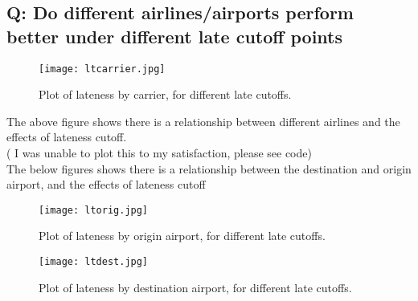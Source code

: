 \documentclass[12pt]{article}
\begin{document}
		\subsection{Q: Do different airlines/airports perform better under different late cutoff points}
		\begin{figure}[h!]
			\centering
			\texttt{[image: ltcarrier.jpg]}
			\caption{Plot of lateness by carrier, for different late cutoffs.}
		\end{figure}
		The above figure shows there is a relationship between different airlines and the effects of lateness cutoff. \\
		( I was unable to plot this to my satisfaction, please see code)
		\\The below figures shows there is a relationship between the destination and origin airport, and the effects of lateness cutoff		
	\newpage
		\begin{figure}[h!]
			\centering
			\texttt{[image: ltorig.jpg]}
			\caption{Plot of lateness by origin airport, for different late cutoffs.}
			\texttt{[image: ltdest.jpg]}
			\caption{Plot of lateness by destination airport, for different late cutoffs.}
		\end{figure}
	\clearpage
\end{document}
